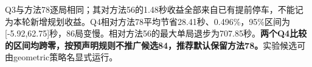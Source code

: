 Q3与方法78逐局相同；其对方法56的1.48秒收益全部来自已有提前停车，不能记为本轮新增规划收益。Q4相对方法78平均节省28.41秒、0.496\%，95\%区间为[-5.92,62.75]秒，86局变慢。相对方法56的最大单局退步为707.85秒。\textbf{两个Q4比较的区间均跨零，按预声明规则不推广候选84，推荐默认保留方法78。}实验候选可由geometric策略名显式运行。